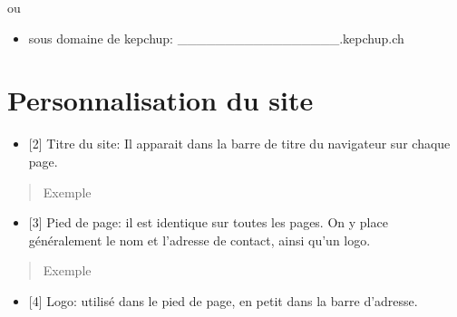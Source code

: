 \documentclass[letterpaper,10pt,english]{sphinxmanual}
\begin{document}
ou
\begin{itemize}
\item {} 
sous domaine de kepchup: \_\_\_\_\_\_\_\_\_\_\_\_\_\_\_\_\_.kepchup.ch

\end{itemize}


\section{Personnalisation du site}
\label{configurer:personnalisation-du-site}\begin{itemize}
\item {} 
{[}2{]} Titre du site: Il apparait dans la barre de titre du navigateur sur chaque page.

\end{itemize}
\begin{quote}\begin{description}
\item[{Exemple}] \leavevmode
{}

\end{description}\end{quote}
\begin{itemize}
\item {} 
{[}3{]} Pied de page: il est identique sur toutes les pages. On y place généralement le nom et l'adresse de contact, ainsi qu'un logo.

\end{itemize}
\begin{quote}\begin{description}
\item[{Exemple}] \leavevmode
{}

\end{description}\end{quote}
\begin{itemize}
\item {} 
{[}4{]} Logo: utilisé dans le pied de page, en petit dans la barre d'adresse.

\end{itemize}
\end{document}

